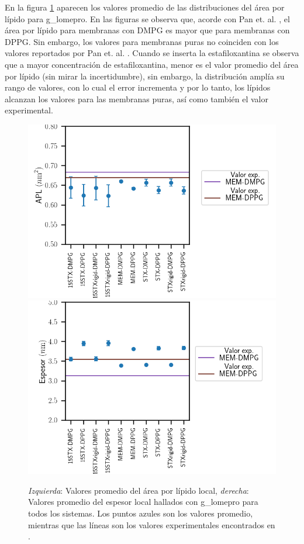En la figura \ref{fig:apl_thickavglomepro} aparecen los valores promedio de las distribuciones del \'{a}rea por l\'{i}pido para g\_lomepro. En las figuras se observa que, acorde con Pan et. al. \cite{Pan2012}, el \'{a}rea por l\'{i}pido para membranas con DMPG es mayor que para membranas con DPPG. Sin embargo, los valores para membranas puras no coinciden con los valores reportados por Pan et. al. \cite{Pan2012}. Cuando se inserta la estafiloxantina se observa que a mayor concentraci\'{o}n de estafiloxantina, menor es el valor promedio del \'{a}rea por l\'{i}pido (sin mirar la incertidumbre), sin embargo, la distribuci\'{o}n  ampl\'{i}a su rango de valores, con lo cual el error incrementa y por lo tanto, los l\'{i}pidos alcanzan los valores para las membranas puras, as\'{i} como tambi\'{e}n el valor experimental.\\
\begin{figure}
\begin{center}
    \includegraphics[scale=0.3]{Plots/apl_av_g_lomepro.png}
     \includegraphics[scale=0.3]{Plots/thickness_average.png}
  \caption{\textit{Izquierda}: Valores promedio del \'{a}rea por l\'{i}pido local, \textit{derecha}: Valores promedio del espesor local  hallados con g\_lomepro para todos los sistemas. Los puntos azules son los valores promedio, mientras que las l\'{i}neas son los valores experimentales encontrados en \cite{Pan2012}. }
  \label{fig:apl_thickavglomepro}
\end{center}
\end{figure}

